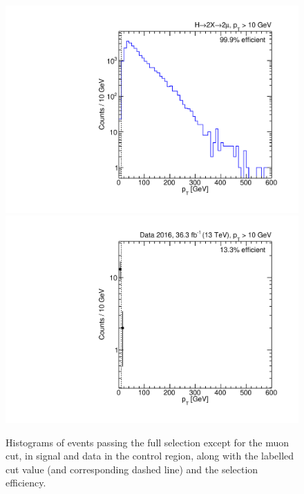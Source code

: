 \begin{figure}[p]
  \centering
  \includegraphics[width=\DSquareWidth]{figures/displaced/NM1_2Mu2J_pT.pdf}
  \hspace*{-2em}
  \includegraphics[width=\DSquareWidth]{figures/displaced/NM1_Data_pT.pdf}
  \caption[Histograms of events passing the full selection except for the muon \pT cut in \twoMu signal and data.]{Histograms of events passing the full selection except for the muon \pT cut, in  \twoMu signal and  data in the control region, along with the labelled cut value (and corresponding dashed line) and the selection efficiency.}
  \label{fig:dd:NM1_pT}
\end{figure}

